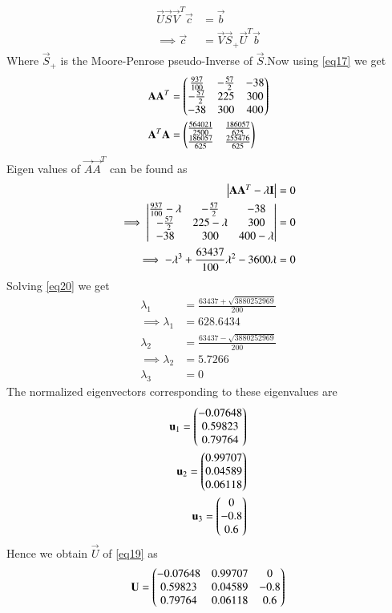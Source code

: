 \documentclass[journal,12pt,twocolumn]{IEEEtran}
\begin{document}
\begin{align}
    \vec{U}\vec{S}\vec{V}^T\vec{c} &= \vec{b}\\
    \implies\vec{c} &= \vec{V}\vec{S}_+\vec{U}^T\vec{b}\label{eq25} 
\end{align}
Where $\vec{S}_+$ is the Moore-Penrose pseudo-Inverse of $\vec{S}$.Now using \eqref{eq17} we get
\begin{align}
    \mathbf{A}\mathbf{A}^T &= \begin{pmatrix}\frac{937}{100}&-\frac{57}{2}&-38\\-\frac{57}{2}&225&300\\-38&300&400\end{pmatrix}\\
    \mathbf{A}^T\mathbf{A} &= \begin{pmatrix}\frac{564021}{2500}&\frac{186057}{625}\\\frac{186057}{625}&\frac{255476}{625}\end{pmatrix}
\end{align}
Eigen values of $\vec{A}\vec{A}^T$ can be found as
\begin{align}
    \begin{vmatrix}\mathbf{A}\mathbf{A}^T-\lambda\mathbf{I}\end{vmatrix} &= 0\\
    \implies\begin{vmatrix}\frac{937}{100}-\lambda&-\frac{57}{2}&-38\\-\frac{57}{2}&225-\lambda&300\\-38&300&400-\lambda\end{vmatrix} &= 0\\
    \implies-\lambda^3+\frac{63437}{100}\lambda^2-3600\lambda&=0\label{eq20}
\end{align}
Solving \eqref{eq20} we get
\begin{align}
    \lambda_1 &= \frac{63437+\sqrt{3880252969}}{200}\\
    \implies\lambda_1 &= 628.6434\\
    \lambda_2 &= \frac{63437-\sqrt{3880252969}}{200}\\
    \implies\lambda_2 &= 5.7266\\
    \lambda_3 &= 0
\end{align}
The normalized eigenvectors corresponding to these eigenvalues are
\begin{align}
    \mathbf{u}_1 = \begin{pmatrix}-0.07648\\0.59823\\0.79764\end{pmatrix}\\ \mathbf{u}_2 = \begin{pmatrix}0.99707\\0.04589\\0.06118\end{pmatrix}\\ \mathbf{u}_3 = \begin{pmatrix}0\\-0.8\\0.6\end{pmatrix}
\end{align}
Hence we obtain $\vec{U}$ of \eqref{eq19} as
\begin{align}
    \mathbf{U} = \begin{pmatrix}-0.07648&0.99707&0\\0.59823&0.04589&-0.8\\0.79764&0.06118&0.6\end{pmatrix}\label{eq21}
\end{align}
\end{document}
